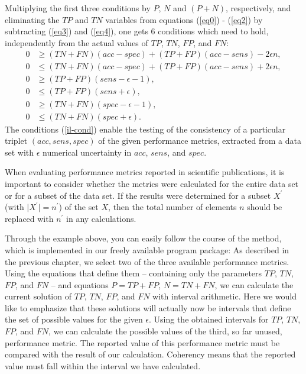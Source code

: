 \documentclass[3p,times]{elsarticle}
\begin{document}
Multiplying the first three conditions by $P$, $N$ and $(P+N)$, respectively, and eliminating the $TP$ and $TN$ variables from equations (\ref{eq0}) - (\ref{eq2}) by subtracting (\ref{eq3}) and (\ref{eq4}), one gets 6 conditions which need to hold, independently from the actual values of $TP$, $TN$, $FP$, and $FN$:
\begin{align}
0 &\geq (TN+FN)(acc-spec)+(TP+FP)(acc-sens)- 2\epsilon n, \nonumber\\
0 &\leq (TN+FN)(acc-spec)+(TP+FP)(acc-sens)+ 2\epsilon n, \nonumber\\
0 &\geq (TP+FP)(sens - \epsilon - 1),\nonumber\\
0 &\leq (TP+FP)(sens + \epsilon),\nonumber\\
0 &\geq (TN+FN)(spec - \epsilon - 1),\nonumber\\
0 &\leq (TN+FN)(spec + \epsilon). \label{il-cond}
\end{align}
The conditions (\ref{il-cond}) enable the testing of the consistency of a particular triplet $(acc, sens, spec)$ of the given performance metrics, extracted from a data set with $\epsilon$ numerical uncertainty in $acc$, $sens$, and $spec$. 

When evaluating performance metrics reported in scientific publications, it is important to consider whether the metrics were calculated for the entire data set or for a subset of the data set. If the results were determined for a subset $X^\prime$ (with $\vert X^\prime\vert=n^\prime$) of the set $X$, then the total number of elements $n$ should be replaced with $n^\prime$ in any calculations.

Through the example above, you can easily follow the course of the method, which is implemented in our freely available program package: As described in the previous chapter, we select two of the three available performance metrics. Using the equations that define them -- containing only the parameters $TP$, $TN$, $FP$, and $FN$ -- and equations $P=TP+FP$, $N=TN+FN$, we can calculate the current solution of $TP$, $TN$, $FP$, and $FN$ with interval arithmetic. Here we would like to emphasize that these solutions will actually now be intervals that define the set of possible values for the given $\epsilon$. Using the obtained intervals for $TP$, $TN$, $FP$, and $FN$, we can calculate the possible values of the third, so far unused, performance metric. The reported value of this performance metric must be compared with the result of our calculation. Coherency means that the reported value must fall within the interval we have calculated.
\end{document}
